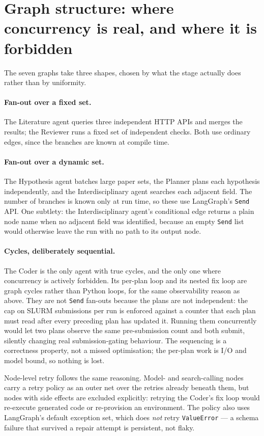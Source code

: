 \section{Graph structure: where concurrency is real, and where it is forbidden}
\label{sec:graphs}

The seven graphs take three shapes, chosen by what the stage actually does rather than by
uniformity.

\paragraph{Fan-out over a fixed set.} The Literature agent queries three independent HTTP APIs
and merges the results; the Reviewer runs a fixed set of independent checks. Both use ordinary
edges, since the branches are known at compile time.

\paragraph{Fan-out over a dynamic set.} The Hypothesis agent batches large paper sets, the
Planner plans each hypothesis independently, and the Interdisciplinary agent searches each
adjacent field. The number of branches is known only at run time, so these use LangGraph's
\texttt{Send} API. One subtlety: the Interdisciplinary agent's conditional edge returns a
plain node name when no adjacent field was identified, because an empty \texttt{Send} list
would otherwise leave the run with no path to its output node.

\paragraph{Cycles, deliberately sequential.} The Coder is the only agent with true cycles, and
the only one where concurrency is actively forbidden. Its per-plan loop and its nested fix
loop are graph cycles rather than Python loops, for the same observability reason as above.
They are not \texttt{Send} fan-outs because the plans are not independent: the cap on SLURM
submissions per run is enforced against a counter that each plan must read after every
preceding plan has updated it. Running them concurrently would let two plans observe the same
pre-submission count and both submit, silently changing real submission-gating behaviour. The
sequencing is a correctness property, not a missed optimisation; the per-plan work is I/O and
model bound, so nothing is lost.

Node-level retry follows the same reasoning. Model- and search-calling nodes carry a retry
policy as an outer net over the retries already beneath them, but nodes with side effects are
excluded explicitly: retrying the Coder's fix loop would re-execute generated code or
re-provision an environment. The policy also uses LangGraph's default exception set, which
does \emph{not} retry \texttt{ValueError} --- a schema failure that survived a repair attempt
is persistent, not flaky.

